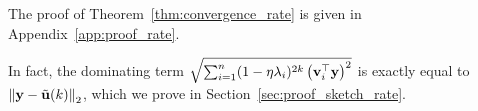The proof of Theorem~\ref{thm:convergence_rate} is given in Appendix~\ref{app:proof_rate}.

In fact, %
the dominating term $\sqrt{\sum_{i=1}^{n}(1-\eta\lambda_i)^{2k} \left(\mathbf{v}_i^\top \mathbf{y}\right)^2}$ is exactly equal to $\left\|\mathbf{y}-\tilde{\mathbf{u}}(k)\right\|_2$, which we prove in Section~\ref{sec:proof_sketch_rate}. 






